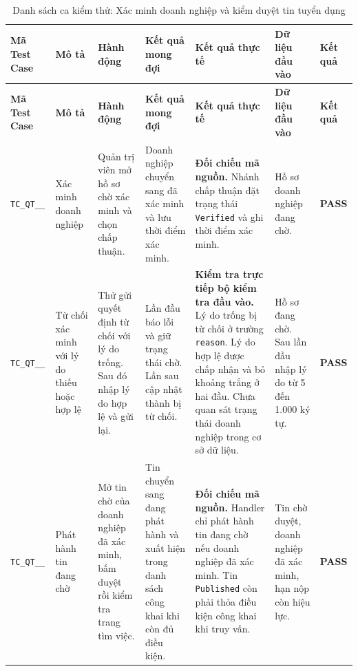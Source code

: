 \begin{landscape}
{
\fontsize{9.5}{11.5}\selectfont
\setlength{\tabcolsep}{3pt}
\renewcommand{\arraystretch}{1.2}
\begin{longtable}{|>{\raggedright\arraybackslash}p{2.1cm}|>{\raggedright\arraybackslash}p{2.8cm}|>{\raggedright\arraybackslash}p{3.8cm}|>{\raggedright\arraybackslash}p{4.0cm}|>{\raggedright\arraybackslash}p{5.0cm}|>{\raggedright\arraybackslash}p{3.2cm}|>{\centering\arraybackslash}p{1.3cm}|}
    \caption{Danh sách ca kiểm thử: Xác minh doanh nghiệp và kiểm duyệt tin tuyển dụng} \label{tab:ts-qt-01} \\
    \hline
    \textbf{Mã Test Case} & \textbf{Mô tả} & \textbf{Hành động} & \textbf{Kết quả mong đợi} & \textbf{Kết quả thực tế} & \textbf{Dữ liệu đầu vào} & \textbf{Kết quả} \\
    \hline
    \endfirsthead
    \hline
    \textbf{Mã Test Case} & \textbf{Mô tả} & \textbf{Hành động} & \textbf{Kết quả mong đợi} & \textbf{Kết quả thực tế} & \textbf{Dữ liệu đầu vào} & \textbf{Kết quả} \\
    \hline
    \endhead
    \hline
    \endfoot
    \hline
    \endlastfoot
    \texttt{TC\_\allowbreak QT\_\allowbreak 01\_\allowbreak 01} & Xác minh doanh nghiệp & Quản trị viên mở hồ sơ chờ xác minh và chọn chấp thuận. & Doanh nghiệp chuyển sang đã xác minh và lưu thời điểm xác minh. & \textbf{Đối chiếu mã nguồn.} Nhánh chấp thuận đặt trạng thái \texttt{Verified} và ghi thời điểm xác minh. & Hồ sơ doanh nghiệp đang chờ. & \textbf{PASS} \\
    \hline
    \texttt{TC\_\allowbreak QT\_\allowbreak 01\_\allowbreak 02} & Từ chối xác minh với lý do thiếu hoặc hợp lệ & Thử gửi quyết định từ chối với lý do trống. Sau đó nhập lý do hợp lệ và gửi lại. & Lần đầu báo lỗi và giữ trạng thái chờ. Lần sau cập nhật thành bị từ chối. & \textbf{Kiểm tra trực tiếp bộ kiểm tra đầu vào.} Lý do trống bị từ chối ở trường \texttt{reason}. Lý do hợp lệ được chấp nhận và bỏ khoảng trắng ở hai đầu. Chưa quan sát trạng thái doanh nghiệp trong cơ sở dữ liệu. & Hồ sơ đang chờ. Sau lần đầu nhập lý do từ 5 đến 1.000 ký tự. & \textbf{PASS} \\
    \hline
    \texttt{TC\_\allowbreak QT\_\allowbreak 01\_\allowbreak 03} & Phát hành tin đang chờ & Mở tin chờ của doanh nghiệp đã xác minh, bấm duyệt rồi kiểm tra trang tìm việc. & Tin chuyển sang đang phát hành và xuất hiện trong danh sách công khai khi còn đủ điều kiện. & \textbf{Đối chiếu mã nguồn.} Handler chỉ phát hành tin đang chờ nếu doanh nghiệp đã xác minh. Tin \texttt{Published} còn phải thỏa điều kiện công khai khi truy vấn. & Tin chờ duyệt, doanh nghiệp đã xác minh, hạn nộp còn hiệu lực. & \textbf{PASS} \\

\end{longtable}}
\end{landscape}
